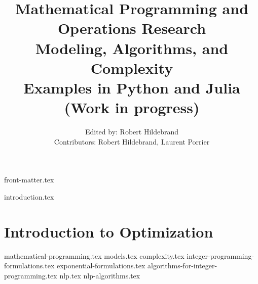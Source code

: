\documentclass[letter,11pt]{book}
\title{ \textbf{Mathematical Programming and\\ Operations Research}\\ Modeling, Algorithms, and Complexity\\
 Examples in Python and Julia\\
 (Work in progress)}
\author{Edited by: Robert Hildebrand\\[1ex]
 Contributors:
 Robert Hildebrand, Laurent Porrier \\
  }
\begin{document}
{front-matter.tex}
\tableofcontents

{introduction.tex}

\part{Introduction to Optimization}
{mathematical-programming.tex}
{models.tex}
{complexity.tex}
{integer-programming-formulations.tex}
{exponential-formulations.tex}
{algorithms-for-integer-programming.tex}
{nlp.tex}
{nlp-algorithms.tex}

\ifx\footfullcite\undefined  %
  
  
\else                        %
  \printbibliography
\fi
\end{document}
